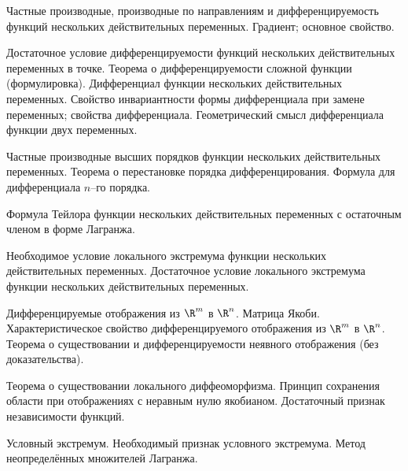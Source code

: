 \documentclass[a4paper]{article}
\begin{document}
\begin{nums}{-1}
\item Частные производные, производные по направлениям и
дифференцируемость функций нескольких действительных переменных.
Градиент; основное свойство.

\item Достаточное условие дифференцируемости функций нескольких
действительных переменных в точке. Теорема о дифференцируемости
сложной функции (формулировка). Дифференциал функции нескольких
действительных переменных. Свойство инвариантности формы
дифференциала при замене переменных; свойства дифференциала.
Геометрический смысл дифференциала функции двух переменных.

\item Частные производные высших порядков функции нескольких
действительных переменных. Теорема о перестановке порядка
дифференцирования. Формула для дифференциала $n$--го порядка.

\item Формула Тейлора функции нескольких действительных переменных с
остаточным членом в форме Лагранжа.

\item Необходимое условие локального экстремума функции нескольких
действительных переменных. Достаточное условие локального экстремума
функции нескольких действительных переменных.

\item Дифференцируемые отображения из $\R^m$ в $\R^n$. Матрица
Якоби. Характеристическое свойство дифференцируемого отображения из
$\R^m$ в $\R^n$. Теорема о существовании и дифференцируемости
неявного отображения (без доказательства).

\item Теорема о существовании локального диффеоморфизма. Принцип
сохранения области при отображениях с неравным нулю якобианом.
Достаточный признак независимости функций.

\item Условный экстремум. Необходимый признак условного экстремума.
Метод неопределённых множителей Лагранжа.
\end{nums}

\medskip\dmvntrail
\end{document}
